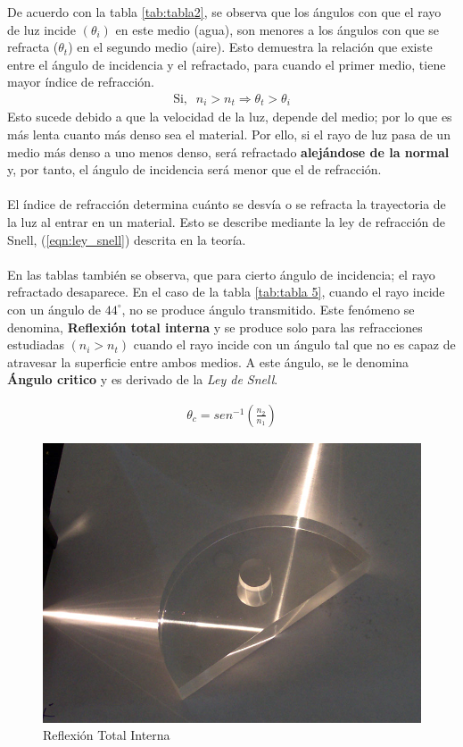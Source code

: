 \documentclass[
aps,
reprint,
amsmath, amssymb,
superscriptaddress,
]{revtex4-2}
\begin{document}
De acuerdo con la tabla \ref{tab:tabla2}, se observa que los ángulos con que el rayo de luz incide $(\theta_i)$ en este medio (agua), son menores a los ángulos con que se refracta ($\theta_t$) en el segundo medio (aire). Esto demuestra la relación que existe entre el ángulo de incidencia y el refractado, para cuando el primer medio, tiene mayor índice de refracción.
\begin{align*}
\text{Si},\;\; n_{i} > n_{t} \Longrightarrow \theta_{t} > \theta_{i}    
\end{align*}
Esto sucede debido a que la velocidad de la luz, depende del medio; por lo que es más lenta cuanto más denso sea el material. Por ello, si el rayo de luz pasa de un medio más denso a uno menos denso, será refractado \textbf{alejándose de la normal} y, por tanto, el ángulo de incidencia será menor que el de refracción. \\
\\
El índice de refracción determina cuánto se desvía o se refracta la trayectoria de la luz al entrar en un material. Esto se describe mediante la ley de refracción de Snell, (\ref{eqn:ley_snell}) descrita en la teoría.\\
\\
En las tablas también se observa, que para cierto ángulo de incidencia; el rayo refractado desaparece. En el caso de la tabla \ref{tab:tabla 5}, cuando el rayo incide con un ángulo de $44^{\circ}$, no se produce ángulo transmitido. Este fenómeno se denomina, \textbf{Reflexión total interna} y se produce solo para las refracciones estudiadas $(n_{i} > n_{t})$ cuando el rayo incide con un ángulo tal que no es capaz de atravesar la superficie entre ambos medios. A este ángulo, se le denomina \textbf{Ángulo critico} y es derivado de la \textit{Ley de Snell}.

\begin{align*}
    \theta_{c} = sen^{-1}\left(\frac{n_{2}}{n_{1}}\right)
\end{align*}

\begin{figure}[H]
\centering
\includegraphics[width=0.5\columnwidth]{img/Total_internal_reflection.jpg}
\caption{\label{fig:g1} Reflexión Total Interna}
\end{figure}
\end{document}
